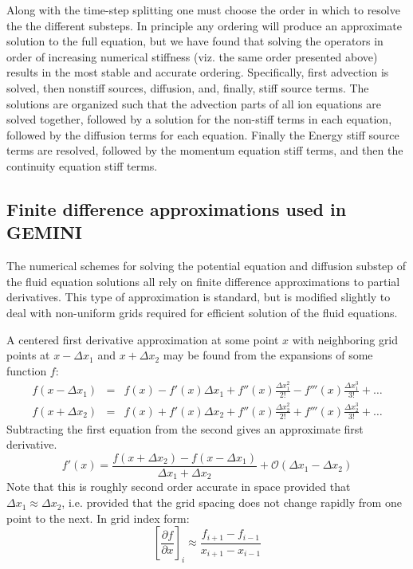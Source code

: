\documentclass[11pt,letterpaper]{article}
\begin{document}
Along with the time-step splitting one must choose the order in which to resolve the the different substeps.  In principle any ordering will produce an approximate solution to the full equation, but we have found that solving the operators in order of increasing numerical stiffness (viz. the same order presented above) results in the most stable and accurate ordering.  Specifically, first advection is solved, then nonstiff sources, diffusion, and, finally, stiff source terms.  The solutions are organized such that the advection parts of all ion equations are solved together, followed by a solution for the non-stiff terms in each equation, followed by the diffusion terms for each equation.  Finally the Energy stiff source terms are resolved, followed by the momentum equation stiff terms, and then the continuity equation stiff terms.  


\subsection{Finite difference approximations used in GEMINI}

The numerical schemes for solving the potential equation and diffusion substep of the fluid equation solutions all rely on finite difference approximations to partial derivatives.  This type of approximation is standard, but is modified slightly to deal with non-uniform grids required for efficient solution of the fluid equations.

A centered first derivative approximation at some point $x$ with neighboring grid points at $x-\Delta x_1$ and $x+\Delta x_2$ may be found from the expansions of some function $f$:
\begin{eqnarray}
f(x-\Delta x_1) &=& f(x) - f'(x)\Delta x_1 + f''(x) \frac{\Delta x_1^2}{2!} - f'''(x) \frac{\Delta x_1^3}{3!} + \dots \nonumber \\
f(x+\Delta x_2) &=& f(x) + f'(x)\Delta x_2 + f''(x) \frac{\Delta x_2^2}{2!} + f'''(x) \frac{\Delta x_2^3}{3!} + \dots \nonumber
\end{eqnarray}
Subtracting the first equation from the second gives an approximate first derivative.
\begin{equation}
f'(x) = \frac{f(x+\Delta x_2) - f(x-\Delta x_1)}{\Delta x_1+\Delta x_2} + \mathcal{O}(\Delta x_1-\Delta x_2) \label{1stderiv}
\end{equation}
Note that this is roughly second order accurate in space provided that $\Delta x_1 \approx \Delta x_2$, i.e. provided that the grid spacing does not change rapidly from one point to the next.  In grid index form:
\begin{equation}
\left[ \frac{\partial f}{\partial x} \right]_i \approx \frac{f_{i+1} - f_{i-1}}{x_{i+1} - x_{i-1}}
\end{equation}
\end{document}
